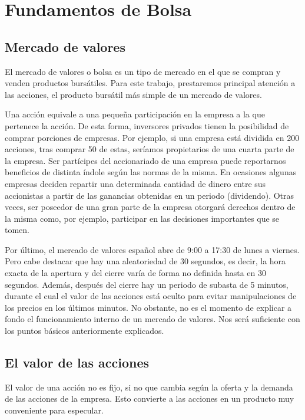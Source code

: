 \section{Fundamentos de Bolsa}
	
		\subsection{Mercado de valores}
		
		El mercado de valores o bolsa es un tipo de mercado en el que se compran y venden productos burs\'atiles. Para este trabajo, prestaremos principal atenci\'on a las acciones, el producto burs\'atil m\'as simple de un mercado de valores.
		
		Una acci\'on equivale a una pequeña participaci\'on en la empresa a la que pertenece la acci\'on. De esta forma, inversores privados tienen la posibilidad de comprar porciones de empresas. Por ejemplo, si una empresa est\'a dividida en 200 acciones, tras comprar 50 de estas, ser\'iamos propietarios de una cuarta parte de la empresa. Ser part\'icipes del accionariado de una empresa puede reportarnos beneficios de distinta \'indole seg\'un las normas de la misma. En ocasiones algunas empresas deciden repartir una determinada cantidad de dinero entre sus accionistas a partir de las ganancias obtenidas en un periodo (dividendo). Otras veces, ser poseedor de una gran parte de la empresa otorgar\'a derechos dentro de la misma como, por ejemplo, participar en las decisiones importantes que se tomen.
		
		Por \'ultimo, el mercado de valores espa\~nol abre de 9:00 a 17:30 de lunes a viernes. Pero cabe destacar que hay una aleatoriedad de 30 segundos, es decir, la hora exacta de la apertura y del cierre var\'ia de forma no definida hasta en 30 segundos. Además, despu\'es del cierre hay un periodo de subasta de 5 minutos, durante el cual el valor de las acciones est\'a oculto para evitar manipulaciones de los precios en los \'ultimos minutos. No obstante, no es el momento de explicar a fondo el funcionamiento interno de un mercado de valores. Nos ser\'a suficiente con los puntos b\'asicos anteriormente explicados.
		
		\subsection{El valor de las acciones}
		
		El valor de una acci\'on no es fijo, si no que cambia seg\'un la oferta y la demanda de las acciones de la empresa. Esto convierte a las acciones en un producto muy conveniente para especular.
		
